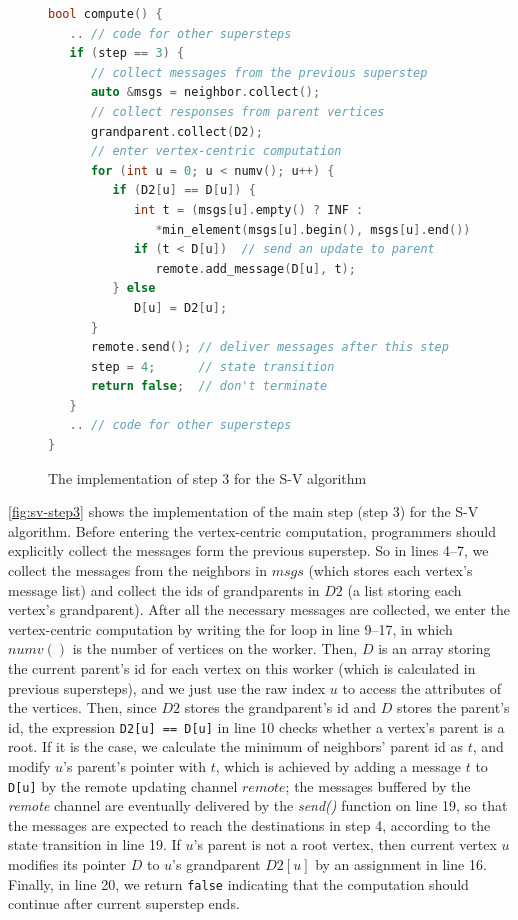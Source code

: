 \documentclass{sokendai_thesis} %
\begin{document}
\begin{figure}[ht]
\centering
\vspace{-2ex}
\begin{lstlisting}[basicstyle=\small\ttfamily,language=c++]
bool compute() {
   .. // code for other supersteps
   if (step == 3) {
      // collect messages from the previous superstep
      auto &msgs = neighbor.collect();
      // collect responses from parent vertices
      grandparent.collect(D2);
      // enter vertex-centric computation
      for (int u = 0; u < numv(); u++) {
         if (D2[u] == D[u]) {
            int t = (msgs[u].empty() ? INF : 
               *min_element(msgs[u].begin(), msgs[u].end()));
            if (t < D[u])  // send an update to parent
               remote.add_message(D[u], t);
         } else
            D[u] = D2[u];
      }
      remote.send(); // deliver messages after this step
      step = 4;      // state transition
      return false;  // don't terminate
   }
   .. // code for other supersteps
}
\end{lstlisting}
\vspace{-2ex}
\caption{The implementation of step 3 for the S-V algorithm}
\label{fig:sv-step3}
\end{figure}

\autoref{fig:sv-step3} shows the implementation of the main step (step 3) for the S-V algorithm.
Before entering the vertex-centric computation, programmers should explicitly collect the messages form the previous superstep.
So in lines 4--7, we collect the messages from the neighbors in $msgs$ (which stores each vertex's message list) and collect the ids of grandparents in $D2$ (a list storing each vertex's grandparent).
After all the necessary messages are collected, we enter the vertex-centric computation by writing the for loop in line 9--17, in which $numv()$ is the number of vertices on the worker.
Then, $D$ is an array storing the current parent's id for each vertex on this worker (which is calculated in previous supersteps), and we just use the raw index $u$ to access the attributes of the vertices.
Then, since $D2$ stores the grandparent's id and $D$ stores the parent's id, the expression \texttt{D2[u] == D[u]} in line 10 checks whether a vertex's parent is a root.
If it is the case, we calculate the minimum of neighbors' parent id as $t$, and modify $u$'s parent's pointer with $t$, which is achieved by adding a message $t$ to \texttt{D[u]} by the remote updating channel $remote$;
the messages buffered by the \emph{remote} channel are eventually delivered by the \emph{send()} function on line 19, so that the messages are expected to reach the destinations in step 4, according to the state transition in line 19.
If $u$'s parent is not a root vertex, then current vertex $u$ modifies its pointer $D$ to $u$'s grandparent $D2[u]$ by an assignment in line 16.
Finally, in line 20, we return \texttt{false} indicating that the computation should continue after current superstep ends.
\end{document}
